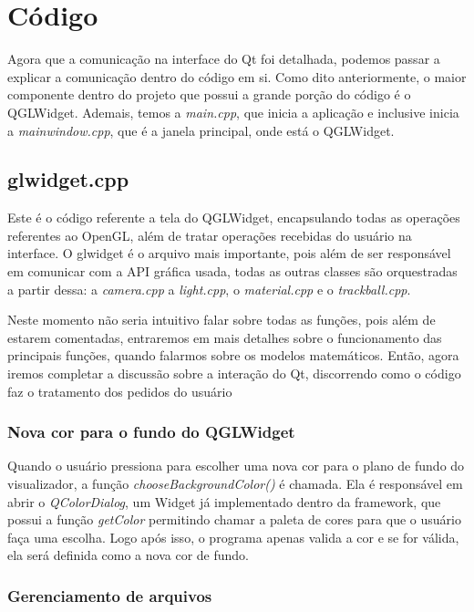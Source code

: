 \section{Código}

Agora que a comunicação na interface do Qt foi detalhada,
podemos passar a explicar a comunicação dentro do código em si. Como dito 
anteriormente, o maior componente dentro do projeto que possui a grande porção
do código é o QGLWidget. Ademais, temos a \emph{main.cpp}, que inicia a aplicação e 
inclusive inicia a \emph{mainwindow.cpp}, que é a janela principal, onde está o QGLWidget.

\subsection{glwidget.cpp}

Este é o código referente a tela do QGLWidget, encapsulando todas as operações 
referentes ao OpenGL, além de tratar operações recebidas do usuário na interface. 
O glwidget é o arquivo mais importante, pois além de ser responsável em comunicar 
com a API gráfica usada, todas as outras classes são orquestradas a partir dessa: 
a \emph{camera.cpp} a \emph{light.cpp}, o \emph{material.cpp} e o \emph{trackball.cpp}.

Neste momento não seria intuitivo falar sobre todas as funções, pois além de estarem comentadas, 
entraremos em mais detalhes sobre o funcionamento das principais funções, quando falarmos 
sobre os modelos matemáticos. Então, agora iremos completar a discussão sobre a interação do 
Qt, discorrendo como o código faz o tratamento dos pedidos do usuário

\subsubsection{Nova cor para o fundo do QGLWidget}

Quando o usuário pressiona para escolher uma nova cor para o plano de fundo do visualizador, 
a função \emph{chooseBackgroundColor()} é chamada. Ela é responsável em abrir o \emph{QColorDialog},
um Widget já implementado dentro da framework, que possui a função \emph{getColor} permitindo chamar 
a paleta de cores para que o usuário faça uma escolha. Logo após isso, o programa apenas valida a cor 
e se for válida, ela será definida como a nova cor de fundo.

\subsubsection{Gerenciamento de arquivos}

